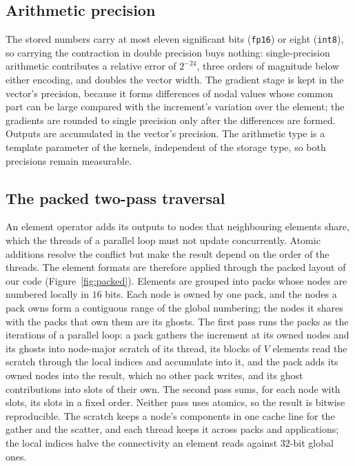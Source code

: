 \documentclass[sigconf,balance=false]{acmart}
\begin{document}
\subsection{Arithmetic precision}
\label{sec:precision}

The stored numbers carry at most eleven significant bits (\texttt{fp16}) or eight (\texttt{int8}),
so carrying the contraction in double precision buys nothing: single-precision arithmetic
contributes a relative error of $2^{-24}$, three orders of magnitude below either encoding, and
doubles the vector width.  The gradient stage is kept in the vector's precision, because it forms
differences of nodal values whose common part can be large compared with the increment's
variation over the element; the gradients are rounded to single precision only after the
differences are formed.  Outputs are accumulated in the vector's precision.  The arithmetic type is
a template parameter of the kernels, independent of the storage type, so both precisions remain
measurable.

\subsection{The packed two-pass traversal}
\label{sec:packed}

An element operator adds its outputs to nodes that neighbouring elements share, which the threads of
a parallel loop must not update concurrently.  Atomic additions resolve the conflict but make the
result depend on the order of the threads.  The element formats are therefore applied through the
packed layout of our code \cite{PackedMesh} (Figure~\ref{fig:packed}).  Elements are grouped into
packs whose nodes are numbered locally in $16$ bits.  Each node is owned by one pack, and the nodes a
pack owns form a contiguous range of the global numbering; the nodes it shares with the packs that own
them are its ghosts.  The first pass runs the packs as the iterations of a parallel loop: a pack
gathers the increment at its owned nodes and its ghosts into node-major scratch of its thread, its
blocks of $V$ elements read the scratch through the local indices and accumulate into it, and the pack
adds its owned nodes into the result, which no other pack writes, and its ghost contributions into
slots of their own.  The second pass sums, for each node with slots, its slots in a fixed order.
Neither pass uses atomics, so the result is bitwise reproducible.  The scratch keeps a node's
components in one cache line for the gather and the scatter, and each thread keeps it across packs and
applications; the local indices halve the connectivity an element reads against $32$-bit global ones.
\end{document}
